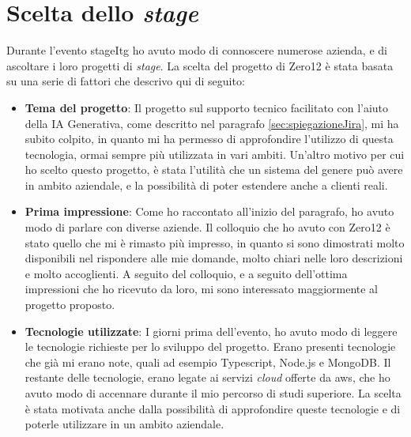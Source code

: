 \section{Scelta dello \textit{stage}} \label{sec:sceltaStage}
Durante l'evento \gls{stageItg} ho avuto modo di connoscere numerose azienda, e di ascoltare i loro progetti di \textit{stage}. 
La scelta del progetto di Zero12 è stata basata su una serie di fattori che descrivo qui di seguito:
\begin{itemize}
    \item \textbf{Tema del progetto}: Il progetto sul supporto tecnico facilitato con l'aiuto della IA Generativa, come descritto nel paragrafo \ref{sec:spiegazioneJira}, mi ha subito colpito, in quanto mi ha permesso di approfondire l'utilizzo di questa tecnologia, ormai sempre più utilizzata in vari ambiti. Un'altro motivo per cui ho scelto questo progetto, è stata l'utilità che un sistema del genere può avere in ambito aziendale, e la possibilità di poter estendere anche a clienti reali.
    \item \textbf{Prima impressione}: Come ho raccontato all'inizio del paragrafo, ho avuto modo di parlare con diverse aziende. Il colloquio che ho avuto con Zero12 è stato quello che mi è rimasto più impresso, in quanto si sono dimostrati molto disponibili nel rispondere alle mie domande, molto chiari nelle loro descrizioni e molto accoglienti. A seguito del colloquio, e a seguito dell'ottima impressioni che ho ricevuto da loro, mi sono interessato maggiormente al progetto proposto.
    \item \textbf{Tecnologie utilizzate}: I giorni prima dell'evento, ho avuto modo di leggere le tecnologie richieste per lo sviluppo del progetto. Erano presenti tecnologie che già mi erano note, quali ad esempio Typescript, Node.js e MongoDB. Il restante delle tecnologie, erano legate ai servizi \textit{cloud} offerte da \gls{aws}, che ho avuto modo di accennare durante il mio percorso di studi superiore. La scelta è stata motivata anche dalla possibilità di approfondire queste tecnologie e di poterle utilizzare in un ambito aziendale.
\end{itemize}


